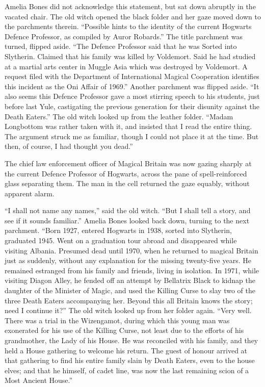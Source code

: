 Amelia Bones did not acknowledge this statement, but sat down abruptly
in the vacated chair. The old witch opened the black folder and her gaze
moved down to the parchments therein. ``Possible hints to the identity
of the current Hogwarts Defence Professor, as compiled by Auror
Robards.'' The title parchment was turned, flipped aside. ``The Defence
Professor said that he was Sorted into Slytherin. Claimed that his
family was killed by Voldemort. Said he had studied at a martial arts
center in Muggle Asia which was destroyed by Voldemort. A request filed
with the Department of International Magical Cooperation identifies this
incident as the Oni Affair of 1969.'' Another parchment was flipped
aside. ``It also seems this Defence Professor gave a most stirring
speech to his students, just before last Yule, castigating the previous
generation for their disunity against the Death Eaters.'' The old witch
looked up from the leather folder. ``Madam Longbottom was rather taken
with it, and insisted that I read the entire thing. The argument struck
me as familiar, though I could not place it at the time. But then, of
course, I had thought you dead.''

The chief law enforcement officer of Magical Britain was now gazing
sharply at the current Defence Professor of Hogwarts, across the pane of
spell-reinforced glass separating them. The man in the cell returned the
gaze equably, without apparent alarm.

``I shall not name any names,'' said the old witch. ``But I shall tell a
story, and see if it sounds familiar.'' Amelia Bones looked back down,
turning to the next parchment. ``Born 1927, entered Hogwarts in 1938,
sorted into Slytherin, graduated 1945. Went on a graduation tour abroad
and disappeared while visiting Albania. Presumed dead until 1970, when
he returned to magical Britain just as suddenly, without any explanation
for the missing twenty-five years. He remained estranged from his family
and friends, living in isolation. In 1971, while visiting Diagon Alley,
he fended off an attempt by Bellatrix Black to kidnap the daughter of
the Minister of Magic, and used the Killing Curse to slay two of the
three Death Eaters accompanying her. Beyond this all Britain knows the
story; need I continue it?'' The old witch looked up from her folder
again. ``Very well. There was a trial in the Wizengamot, during which
this young man was exonerated for his use of the Killing Curse, not
least due to the efforts of his grandmother, the Lady of his House. He
was reconciled with his family, and they held a House gathering to
welcome his return. The guest of honour arrived at that gathering to
find his entire family slain by Death Eaters, even to the house elves;
and that he himself, of cadet line, was now the last remaining scion of
a Most Ancient House.''

